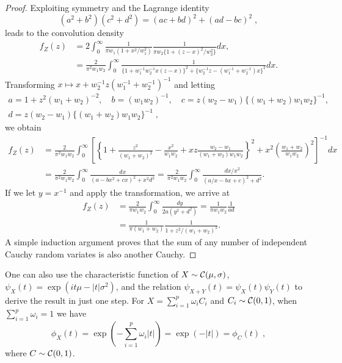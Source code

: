 \documentclass[lineno]{biometrika}
\begin{document}
\begin{proof}
Exploiting symmetry and the Lagrange identity 
$$
(a^2 + b^2)(c^2 + d^2) = (ac+bd)^2 + (ad-bc)^2
\;,
$$ 
leads to the convolution density
\begin{align*} 
  f_Z(z) &= 2 \int_{0}^{\infty} 
  \frac{1}{ \pi w_1 (1+ x^2/w_1^2)} \frac{1}{\pi w_2 \{1+ (z-x)^2 / w_2^2 \} } dx, 
  \\
  & = \frac{2}{\pi^2 w_1 w_2} \int_{0}^{\infty} 
  \frac{1}{\{1+ w_1^{-1} w_2^{-1} x (z-x) \}^2 + \{w_2^{-1}z - (w_1^{-1}+ w_2^{-1}) x \}^2 } dx.
\end{align*}
Transforming $x \mapsto x + w_2^{-1}z (w_1^{-1} + w_2^{-1})^{-1}$ and letting
\begin{gather*}
a = 1 + z^2(w_1+w_2)^{-2},\quad b =(w_1 w_2)^{-1},\quad
c = z (w_2-w_1) \{(w_1+w_2) w_1 w_2\}^{-1},
\\
d = z (w_2-w_1)\{(w_1+w_2) w_1 w_2\}^{-1}
\;, 
\end{gather*}
we obtain
\begin{align*}
  f_Z(z) &= \frac{2}{\pi^2 w_1 w_2} \int_{0}^{\infty} 
  \left[ 
    \left\{ 1 + \frac{z^2}{(w_1+w_2)^2} - \frac{x^2}{w_1w_2} + 
      xz \frac{w_2-w_1}{(w_1+w_2) w_1 w_2} \right\}^2 + 
    x^2 \left(\frac{w_1 + w_2}{w_1w_2} \right)^2 
  \right]^{-1} dx 
  \\
  &= \frac{2}{\pi^2 w_1 w_2} \int_{0}^{\infty} 
  \frac{dx}{\left( a - b x^2 + cx \right)^2 + x^2 d^2} 
  = \frac{2}{\pi^2 w_1 w_2} \int_{0}^{\infty} 
  \frac{dx/x^2}{\left(a/x - bx + c \right)^2 + d^2 }.
\end{align*}
If we let $y = x^{-1}$ and apply the \CS{} transformation, we arrive at 
\begin{align*}
  f_Z(z) &= \frac{2}{\pi w_1 w_2} \int_{0}^{\infty} \frac{dy}{2a (y^2 + d^2)} 
  = \frac{1}{\pi w_1 w_2} \frac{1}{ad} 
  \\
  &= \frac{1}{\pi (w_1+w_2)} \frac{1}{1+ z^2/(w_1+w_2)^2}.
\end{align*}
A simple induction argument proves that the sum of any number of independent
Cauchy random variates is also another Cauchy.
\end{proof}

One can also use the characteristic function of $X \sim \mathcal{C}(\mu, \sigma)$,
$\psi_X(t) = \exp(it \mu - |t| \sigma^2)$, and the relation 
$\psi_{X+Y}(t) = \psi_X(t) \psi_Y(t)$ to derive the result in just one step.  
For $X = \sum_{i=1}^{p} \omega_i C_i$ and $C_i \sim \mathcal{C}(0,1)$, 
when $\sum_{i=1}^{p} \omega_i = 1$ we have 
$$
\phi_X(t) = \exp\left(-\sum_{i=1}^{p}\omega_i |t|\right) = \exp(-|t|) = \phi_C(t)
\;,
$$ 
where $C \sim \mathcal{C}(0, 1)$. 
\end{document}
